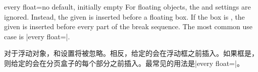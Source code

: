 \begin{docTcbKey}[][doc new=2014-09-19]{every float}{=}{no default, initially empty}
For floating objects, the  and 
settings are ignored. Instead, the given  is inserted before
a floating box. If the box is , the given  is
inserted before every part of the break sequence.
The most common use case is |every float=\centering|.

对于浮动对象，和设置将被忽略。相反，给定的会在浮动框之前插入。如果框是，则给定的会在分页盒子的每个部分之前插入。最常见的用法是|every float=\centering|。


\begin{dispListing}
\end{dispListing}
{\tcbusetemp}

\end{docTcbKey}